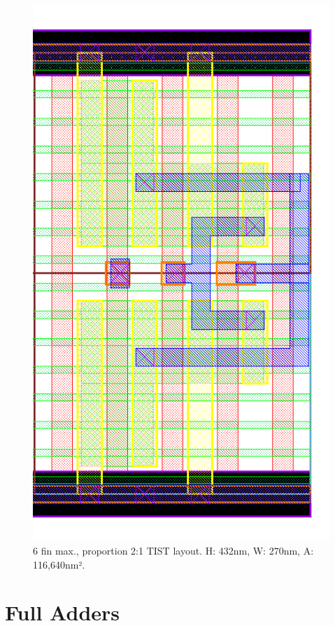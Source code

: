 \documentclass[pgmicro,diss,english]{iiufrgs}
\begin{document}
\begin{figure}[]
\centering
\includegraphics[width=\textwidth,height=\textheight,keepaspectratio]{TIST6F3F.png}
\caption{6 fin max., proportion 2:1 TIST layout. H: 432nm, W: 270nm, A: 116,640nm². }
\label{fig:TIST5F}
\end{figure}





\chapter{Full Adders}
\end{document}
